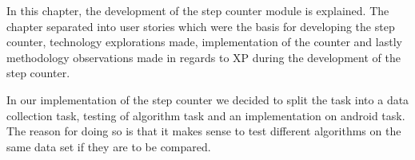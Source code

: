 In this chapter, the development of the step counter module is explained. The chapter separated into user stories which were the basis for developing the step counter, technology explorations made, implementation of the counter and lastly methodology observations made in regards to XP during the development of the step counter. 

In our implementation of the step counter we decided to split the task into a data collection task, testing of algorithm task and an implementation on android task. The reason for doing so is that it makes sense to test different algorithms on the same data set if they are to be compared.